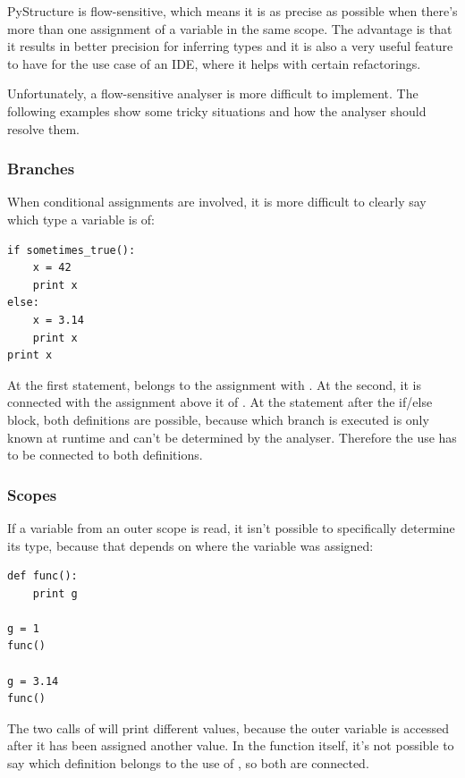 \documentclass[12pt,halfparskip,DIV11,BCOR10mm]{scrreprt}
\begin{document}
PyStructure is flow-sensitive, which means it is as precise as possible when there's more than one assignment of a variable in the same scope. The advantage is that it results in better precision for inferring types and it is also a very useful feature to have for the use case of an IDE, where it helps with certain refactorings.

Unfortunately, a flow-sensitive analyser is more difficult to implement. The following examples show some tricky situations and how the analyser should resolve them.

\subsubsection{Branches}

When conditional assignments are involved, it is more difficult to clearly say which type a variable is of:

\begin{lstlisting}
if sometimes_true():
    x = 42
    print x
else:
    x = 3.14
    print x
print x
\end{lstlisting}

At the first  statement,  belongs to the assignment with . At the second, it is connected with the assignment above it of . At the  statement after the if/else block, both definitions are possible, because which branch is executed is only known at runtime and can't be determined by the analyser. Therefore the use has to be connected to both definitions.

\subsubsection{Scopes}

If a variable from an outer scope is read, it isn't possible to specifically determine its type, because that depends on where the variable was assigned:

\begin{lstlisting}
def func():
    print g

g = 1
func()

g = 3.14
func()
\end{lstlisting}

The two calls of  will print different values, because the outer variable  is accessed after it has been assigned another value. In the function itself, it's not possible to say which definition belongs to the use of , so both are connected.
\end{document}
